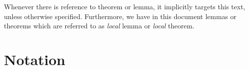 \begin{center}
Whenever there is reference to theorem or lemma, it implicitly
targets this text, unless otherwise specified.
Furthermore, we have in this document lemmas or theorems
which are referred to as \emph{local} lemma
or \emph{local} theorem.
\end{center}

\section*{Notation}




\iftrue
 
 
 
 
 
 
 
 
 
 
 
 
 
\else
\fi


% 



\printindex



